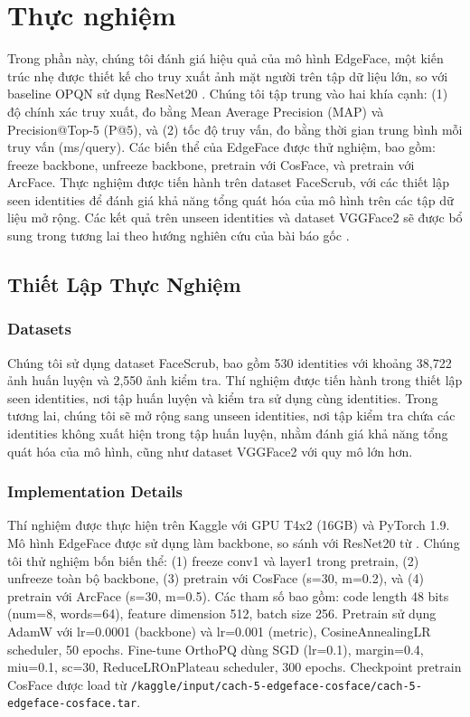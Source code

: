 \chapter{Thực nghiệm}
\label{Chapter 4}

Trong phần này, chúng tôi đánh giá hiệu quả của mô hình EdgeFace, một kiến trúc nhẹ được thiết kế cho truy xuất ảnh mặt người trên tập dữ liệu lớn, so với baseline OPQN sử dụng ResNet20 \cite{opqn}. Chúng tôi tập trung vào hai khía cạnh: (1) độ chính xác truy xuất, đo bằng Mean Average Precision (MAP) và Precision@Top-5 (P@5), và (2) tốc độ truy vấn, đo bằng thời gian trung bình mỗi truy vấn (ms/query). Các biến thể của EdgeFace được thử nghiệm, bao gồm: freeze backbone, unfreeze backbone, pretrain với CosFace, và pretrain với ArcFace. Thực nghiệm được tiến hành trên dataset FaceScrub, với các thiết lập seen identities để đánh giá khả năng tổng quát hóa của mô hình trên các tập dữ liệu mở rộng. Các kết quả trên unseen identities và dataset VGGFace2 sẽ được bổ sung trong tương lai theo hướng nghiên cứu của bài báo gốc \cite{opqn}.

\section{Thiết Lập Thực Nghiệm}

\subsection{Datasets}
Chúng tôi sử dụng dataset FaceScrub, bao gồm 530 identities với khoảng 38,722 ảnh huấn luyện và 2,550 ảnh kiểm tra. Thí nghiệm được tiến hành trong thiết lập seen identities, nơi tập huấn luyện và kiểm tra sử dụng cùng identities. Trong tương lai, chúng tôi sẽ mở rộng sang unseen identities, nơi tập kiểm tra chứa các identities không xuất hiện trong tập huấn luyện, nhằm đánh giá khả năng tổng quát hóa của mô hình, cũng như dataset VGGFace2 với quy mô lớn hơn.

\subsection{Implementation Details}
Thí nghiệm được thực hiện trên Kaggle với GPU T4x2 (16GB) và PyTorch 1.9. Mô hình EdgeFace được sử dụng làm backbone, so sánh với ResNet20 từ \cite{opqn}. Chúng tôi thử nghiệm bốn biến thể: (1) freeze conv1 và layer1 trong pretrain, (2) unfreeze toàn bộ backbone, (3) pretrain với CosFace (s=30, m=0.2), và (4) pretrain với ArcFace (s=30, m=0.5). Các tham số bao gồm: code length 48 bits (num=8, words=64), feature dimension 512, batch size 256. Pretrain sử dụng AdamW với lr=0.0001 (backbone) và lr=0.001 (metric), CosineAnnealingLR scheduler, 50 epochs. Fine-tune OrthoPQ dùng SGD (lr=0.1), margin=0.4, miu=0.1, sc=30, ReduceLROnPlateau scheduler, 300 epochs. Checkpoint pretrain CosFace được load từ \texttt{/kaggle/input/cach-5-edgeface-cosface/cach-5-edgeface-cosface.tar}.

